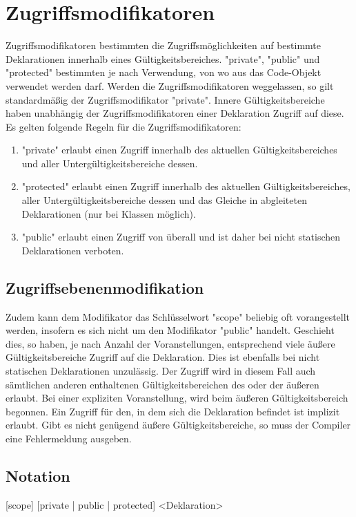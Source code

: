 \chapter { Zugriffsmodifikatoren }

Zugriffsmodifikatoren bestimmten die Zugriffsmöglichkeiten auf bestimmte Deklarationen innerhalb eines Gültigkeitsbereiches.
"private", "public" und "protected" bestimmten je nach Verwendung, von wo aus das Code-Objekt verwendet werden darf.
Werden die Zugriffsmodifikatoren weggelassen, so gilt standardmäßig der Zugriffsmodifikator "private".
Innere Gültigkeitsbereiche haben unabhängig der Zugriffsmodifikatoren einer Deklaration Zugriff auf diese.
Es gelten folgende Regeln für die Zugriffsmodifikatoren:
\begin {enumerate}
     \item "private" erlaubt einen Zugriff innerhalb des aktuellen Gültigkeitsbereiches und aller Untergültigkeitsbereiche dessen.
     \item "protected" erlaubt einen Zugriff innerhalb des aktuellen Gültigkeitsbereiches, aller Untergültigkeitsbereiche dessen und das Gleiche in abgleiteten
Deklarationen (nur bei Klassen möglich).
     \item "public" erlaubt einen Zugriff von überall und ist daher bei nicht statischen Deklarationen verboten.
\end {enumerate}

\section { Zugriffsebenenmodifikation }
Zudem kann dem Modifikator das Schlüsselwort "scope" beliebig oft vorangestellt werden, insofern es sich nicht
um den Modifikator "public" handelt.
Geschieht dies, so haben, je nach Anzahl der Voranstellungen, entsprechend viele äußere Gültigkeitsbereiche
Zugriff auf die Deklaration.
Dies ist ebenfalls bei nicht statischen Deklarationen unzulässig.
Der Zugriff wird in diesem Fall auch sämtlichen anderen enthaltenen Gültigkeitsbereichen des oder der äußeren erlaubt.
Bei einer expliziten Voranstellung, wird beim äußeren Gültigkeitsbereich begonnen. Ein Zugriff für den, in dem sich die
Deklaration befindet ist implizit erlaubt. Gibt es nicht genügend äußere Gültigkeitsbereiche, so muss der Compiler eine
Fehlermeldung ausgeben.

\section { Notation }
[scope] [private | public | protected] <Deklaration> 
